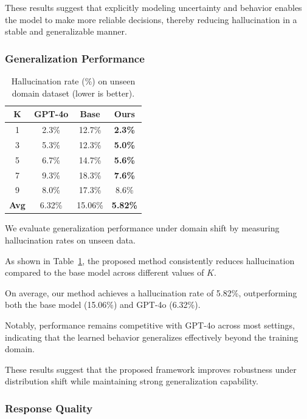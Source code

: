 These results suggest that explicitly modeling uncertainty and behavior enables the model to make more reliable decisions, thereby reducing hallucination in a stable and generalizable manner.

\subsubsection{Generalization Performance}

\begin{table}[h]
\centering
\caption{Hallucination rate (\%) on unseen domain dataset (lower is better).}
\label{tab:generalization}
\begin{tabular}{cccc}
\toprule
K & GPT-4o & Base & Ours \\
\midrule
1 & 2.3\% & 12.7\% & \textbf{2.3\%} \\
3 & 5.3\% & 12.3\% & \textbf{5.0\%} \\
5 & 6.7\% & 14.7\% & \textbf{5.6\%} \\
7 & 9.3\% & 18.3\% & \textbf{7.6\%} \\
9 & 8.0\% & 17.3\% & 8.6\% \\
\midrule
\textbf{Avg} & 6.32\% & 15.06\% & \textbf{5.82\%} \\
\bottomrule
\end{tabular}
\end{table}

We evaluate generalization performance under domain shift by measuring hallucination rates on unseen data.

As shown in Table~\ref{tab:generalization}, the proposed method consistently reduces hallucination compared to the base model across different values of $K$.

On average, our method achieves a hallucination rate of 5.82\%, outperforming both the base model (15.06\%) and GPT-4o (6.32\%).

Notably, performance remains competitive with GPT-4o across most settings, indicating that the learned behavior generalizes effectively beyond the training domain.

These results suggest that the proposed framework improves robustness under distribution shift while maintaining strong generalization capability.

\subsubsection{Response Quality}

